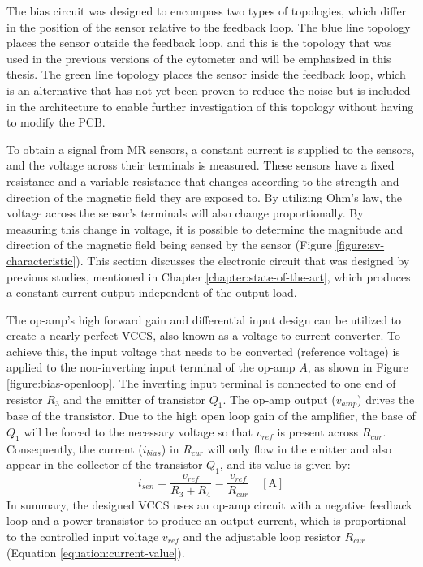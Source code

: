 The bias circuit was designed to encompass two types of topologies, which differ in the position of the sensor relative to the feedback loop. The blue line topology places the sensor outside the feedback loop, and this is the topology that was used in the previous versions of the cytometer and will be emphasized in this thesis. The green line topology places the sensor inside the feedback loop, which is an alternative that has not yet been proven to reduce the noise but is included in the architecture to enable further investigation of this topology without having to modify the \ac{PCB}.


\noindent
To obtain a signal from \ac{MR} sensors, a constant current is supplied to the sensors, and the voltage across their terminals is measured. These sensors have a fixed resistance and a variable resistance that changes according to the strength and direction of the magnetic field they are exposed to. By utilizing Ohm's law, the voltage across the sensor's terminals will also change proportionally. By measuring this change in voltage, it is possible to determine the magnitude and direction of the magnetic field being sensed by the sensor (Figure \ref{figure:sv-characteristic}). This section discusses the electronic circuit that was designed by previous studies, mentioned in Chapter \ref{chapter:state-of-the-art}, which produces a constant current output independent of the output load.

The op-amp's high forward gain and differential input design can be utilized to create a nearly perfect \ac{VCCS}, also known as a voltage-to-current converter. To achieve this, the input voltage that needs to be converted (reference voltage) is applied to the non-inverting input terminal of the op-amp $A$, as shown in Figure \ref{figure:bias-openloop}. The inverting input terminal is connected to one end of resistor $R_3$ and the emitter of transistor $Q_1$. The op-amp output ($v_{amp}$) drives the base of the transistor. Due to the high open loop gain of the amplifier, the base of $Q_1$ will be forced to the necessary voltage so that $v_{ref}$ is present across $R_{cur}$. Consequently, the current ($i_{bias}$) in $R_{cur}$ will only flow in the emitter and also appear in the collector of the transistor $Q_1$, and its value is given by:
\begin{equation}
\label{equation:current-value}
    i_{sen} = \frac{v_{ref}}{R_3 + R_4} = \frac{v_{ref}}{R_{cur}} \quad[\mathrm{A}]
\end{equation}
\noindent
In summary, the designed \ac{VCCS} uses an op-amp circuit with a negative feedback loop and a power transistor to produce an output current, which is proportional to the controlled input voltage $v_{ref}$ and the adjustable loop resistor $R_{cur}$ (Equation \ref{equation:current-value}).

